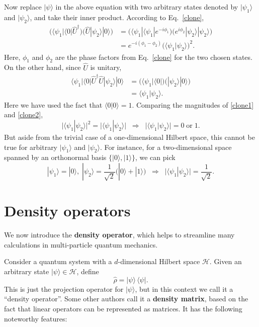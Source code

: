 \documentclass[pra,12pt]{revtex4}
\begin{document}
Now replace $|\psi\rangle$ in the above equation with two arbitrary
states denoted by $|\psi_1\rangle$ and $|\psi_2\rangle$, and take
their inner product.  According to Eq.~\eqref{clone},
\begin{align}
  \Big(\langle \psi_1 | \langle 0 | \hat{U}^\dagger \Big)
  \Big(\hat{U} | \psi_2 \rangle |0\rangle \Big)
  &=  \Big(\langle \psi_1| \langle \psi_1| e^{-i\phi_1} \Big) \Big( e^{i\phi_2} |\psi_2\rangle|\psi_2\rangle\Big) \\
  &= e^{-i(\phi_1-\phi_2)} \Big( \langle\psi_1 | \psi_2\rangle \Big)^2. \label{clone1}
\end{align}
Here, $\phi_1$ and $\phi_2$ are the phase factors from
Eq.~\eqref{clone} for the two chosen states.  On the other hand, since
$\hat{U}$ is unitary,
\begin{align}
  \langle \psi_1 | \langle 0 | \hat{U}^\dagger \hat{U} | \psi_2 \rangle |0\rangle
  &= \Big(\langle \psi_1 | \langle 0| \Big) \Big(| \psi_2 \rangle |0\rangle\Big)
  \\ &= \langle\psi_1 | \psi_2\rangle. \label{clone2}
\end{align}
Here we have used the fact that $\langle 0 | 0\rangle = 1$.  Comparing
the magnitudes of \eqref{clone1} and \eqref{clone2},
\begin{equation}
  \big|\langle \psi_1 | \psi_2\rangle \big|^2
  = \big| \langle\psi_1 | \psi_2\rangle \big|
  \;\;\Rightarrow \;\;
  \big|\langle\psi_1 | \psi_2\rangle\big| = 0 \;\mathrm{or}\; 1.
\end{equation}
But aside from the trivial case of a one-dimensional Hilbert space,
this cannot be true for arbitrary $|\psi_1\rangle$ and
$|\psi_2\rangle$.  For instance, for a two-dimensional space spanned
by an orthonormal basis $\{|0\rangle, |1\rangle\}$, we can pick
\begin{equation}
  |\psi_1\rangle = |0\rangle, \;
  |\psi_2\rangle = \frac{1}{\sqrt{2}}\big(|0\rangle +
  |1\rangle\big)
  \;\;\Rightarrow\;\;
  \big|\langle\psi_1|\psi_2\rangle\big| = \frac{1}{\sqrt{2}}.
\end{equation}

\clearpage
\section{Density operators}

We now introduce the \textbf{density operator}, which helps to
streamline many calculations in multi-particle quantum mechanics.

Consider a quantum system with a $d$-dimensional Hilbert space
$\mathscr{H}$.  Given an arbitrary state $|\psi\rangle \in
\mathscr{H}$, define
\begin{equation}
  \hat{\rho} = |\psi\rangle\, \langle\psi|.
  \label{rho_pure}
\end{equation}
This is just the projection operator for $|\psi\rangle$, but in this
context we call it a ``density operator''.  Some other authors call it
a \textbf{density matrix}, based on the fact that linear operators can
be represented as matrices.  It has the following noteworthy features:
\end{document}
